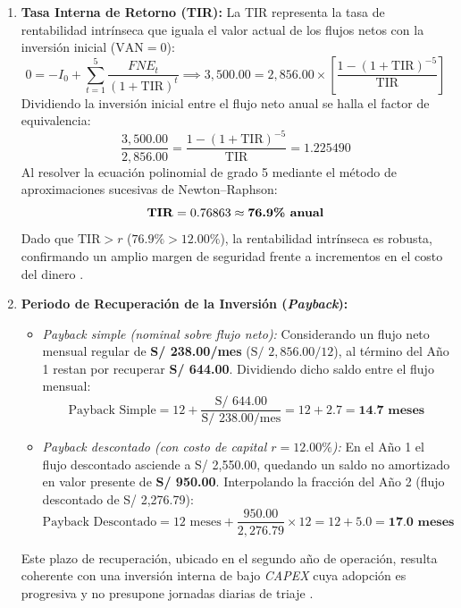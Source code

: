 \begin{enumerate}[leftmargin=1.27cm, label=\alph*)]
    \item \textbf{Tasa Interna de Retorno (TIR):} La TIR representa la tasa de rentabilidad intrínseca que iguala el valor actual de los flujos netos con la inversión inicial ($\text{VAN} = 0$):
    \begin{equation}
        0 = -I_0 + \sum_{t=1}^{5} \frac{FNE_t}{(1 + \text{TIR})^t} \implies 3,500.00 = 2,856.00 \times \left[ \frac{1 - (1 + \text{TIR})^{-5}}{\text{TIR}} \right]
    \end{equation}
    Dividiendo la inversión inicial entre el flujo neto anual se halla el factor de equivalencia:
    \begin{equation}
        \frac{3,500.00}{2,856.00} = \frac{1 - (1 + \text{TIR})^{-5}}{\text{TIR}} = 1.225490
    \end{equation}
    Al resolver la ecuación polinomial de grado 5 mediante el método de aproximaciones sucesivas de Newton--Raphson:
    \begin{equation}
        \text{\textbf{TIR}} = 0.76863 \approx \text{\textbf{76.9\% anual}}
    \end{equation}
    Dado que $\text{TIR} > r$ ($76.9\% > 12.00\%$), la rentabilidad intrínseca es robusta, confirmando un amplio margen de seguridad frente a incrementos en el costo del dinero \parencite{torres2026proyecto}. %

    \item \textbf{Periodo de Recuperación de la Inversión (\textit{Payback}):}
    \begin{itemize}
        \item \textit{Payback simple (nominal sobre flujo neto):} Considerando un flujo neto mensual regular de \textbf{S/ 238.00/mes} ($\text{S/ } 2,856.00/12$), al término del Año 1 restan por recuperar \textbf{S/ 644.00}. Dividiendo dicho saldo entre el flujo mensual:
        \begin{equation}
            \text{Payback Simple} = 12 + \frac{\text{S/ } 644.00}{\text{S/ } 238.00\text{/mes}} = 12 + 2.7 = \textbf{14.7 meses}
        \end{equation}
        \item \textit{Payback descontado (con costo de capital $r = 12.00\%$):} En el Año 1 el flujo descontado asciende a S/ 2,550.00, quedando un saldo no amortizado en valor presente de \textbf{S/ 950.00}. Interpolando la fracción del Año 2 (flujo descontado de S/ 2,276.79):
        \begin{equation}
            \text{Payback Descontado} = 12\text{ meses} + \frac{950.00}{2,276.79} \times 12 = 12 + 5.0 = \textbf{17.0 meses}
        \end{equation}
    \end{itemize}
    Este plazo de recuperación, ubicado en el segundo año de operación, resulta coherente con una inversión interna de bajo \textit{CAPEX} cuya adopción es progresiva y no presupone jornadas diarias de triaje \parencite{torres2026proyecto}. %
\end{enumerate}

